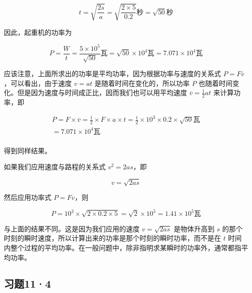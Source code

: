 \[
t = \sqrt {\frac {2 s}{a}} = \sqrt {\frac {2 \times 5}{0.2}} \text{秒} = \sqrt {50} \text{秒}
\]

因此，起重机的功率为

\[
P = \frac {W}{t} = \frac {5 \times 10 ^ {5}}{\sqrt {50}} \text{瓦} = \sqrt {50} \times 10 ^ {4} \text{瓦} = 7.071 \times 10 ^ {4} \text{瓦}
\]

应该注意，上面所求出的功率是平均功率，因为根据功率与速度的关系式
\(P = F \overline{v}\)，可以看出，由于速度 \(v = at\)
是随着时间在变化的，所以功率 \(P\)
也随着时间变化。但是因为速度与时间成正比，因而我们也可以用平均速度
\(\overline{v} = \frac{1}{2} at\) 来计算功率，即

\[
\begin{array}{l} P = F \times \overline {{v}} = \frac {1}{2} \times F \times a \times t = \frac {1}{2} \times 10 ^ {3} \times 0.2 \times \sqrt {50} \text{瓦} \\ = 7.071 \times 10 ^ {4} \text{瓦} \\ \end{array}
\]

得到同样结果。

如果我们应用速度与路程的关系式 \(v^2 = 2as\)，即

\[
v = \sqrt {2 a s}
\]

然后应用功率式 \(P = Fv\)，则

\[
P = 10 ^ {3} \times \sqrt {2 \times 0.2 \times 5} = \sqrt {2} \times 10 ^ {5} = 1.41 \times 10 ^ {5} \text{瓦}
\]

与上面的结果不同。这是因为我们应用的速度 \(v = \sqrt{2as}\) 是物体升高到
\(s\)
的那个时刻的瞬时速度，所以计算出来的功率是那个时刻的瞬时功率，而不是在
\(t\)
时间内整个过程的平均功率。在一般问题中，除非指明求某瞬时的功率外，通常都指平均功率。

\subsection{习题11·4}\label{ux4e60ux9898114}

